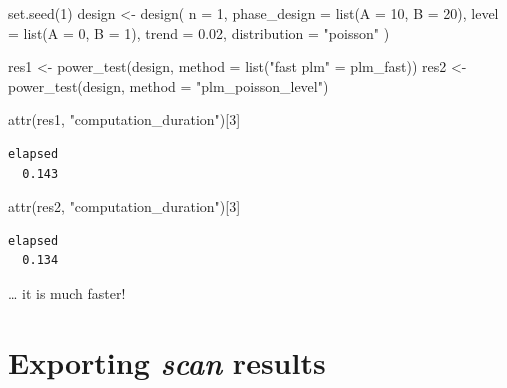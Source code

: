\documentclass[
  letterpaper,
  DIV=11,
  numbers=noendperiod]{scrreprt}
\newenvironment{Shaded}{\begin{snugshade}}{\end{snugshade}}
\newcommand{\AttributeTok}[1]{\textcolor[rgb]{0.40,0.45,0.13}{#1}}
\newcommand{\DecValTok}[1]{\textcolor[rgb]{0.68,0.00,0.00}{#1}}
\newcommand{\FloatTok}[1]{\textcolor[rgb]{0.68,0.00,0.00}{#1}}
\newcommand{\FunctionTok}[1]{\textcolor[rgb]{0.28,0.35,0.67}{#1}}
\newcommand{\NormalTok}[1]{\textcolor[rgb]{0.00,0.23,0.31}{#1}}
\newcommand{\OtherTok}[1]{\textcolor[rgb]{0.00,0.23,0.31}{#1}}
\newcommand{\StringTok}[1]{\textcolor[rgb]{0.13,0.47,0.30}{#1}}
\begin{document}
\begin{Shaded}
\begin{Highlighting}[]
\FunctionTok{set.seed}\NormalTok{(}\DecValTok{1}\NormalTok{)}
\NormalTok{design }\OtherTok{\textless{}{-}} \FunctionTok{design}\NormalTok{(}
  \AttributeTok{n =} \DecValTok{1}\NormalTok{,}
  \AttributeTok{phase\_design =} \FunctionTok{list}\NormalTok{(}\AttributeTok{A =} \DecValTok{10}\NormalTok{, }\AttributeTok{B =} \DecValTok{20}\NormalTok{),}
  \AttributeTok{level =} \FunctionTok{list}\NormalTok{(}\AttributeTok{A =} \DecValTok{0}\NormalTok{, }\AttributeTok{B =} \DecValTok{1}\NormalTok{),}
  \AttributeTok{trend =} \FloatTok{0.02}\NormalTok{,}
  \AttributeTok{distribution =} \StringTok{"poisson"}
\NormalTok{)}

\NormalTok{res1 }\OtherTok{\textless{}{-}} \FunctionTok{power\_test}\NormalTok{(design, }\AttributeTok{method =} \FunctionTok{list}\NormalTok{(}\StringTok{"fast plm"} \OtherTok{=}\NormalTok{ plm\_fast))}
\NormalTok{res2 }\OtherTok{\textless{}{-}} \FunctionTok{power\_test}\NormalTok{(design, }\AttributeTok{method =} \StringTok{"plm\_poisson\_level"}\NormalTok{)}

\FunctionTok{attr}\NormalTok{(res1, }\StringTok{"computation\_duration"}\NormalTok{)[}\DecValTok{3}\NormalTok{]}
\end{Highlighting}
\end{Shaded}

\begin{verbatim}
elapsed 
  0.143 
\end{verbatim}

\begin{Shaded}
\begin{Highlighting}[]
\FunctionTok{attr}\NormalTok{(res2, }\StringTok{"computation\_duration"}\NormalTok{)[}\DecValTok{3}\NormalTok{]}
\end{Highlighting}
\end{Shaded}

\begin{verbatim}
elapsed 
  0.134 
\end{verbatim}

\ldots{} it is much faster!


\hypertarget{exporting-scan-results}{%
\chapter{\texorpdfstring{Exporting \emph{scan}
results}{Exporting scan results}}\label{exporting-scan-results}}
\end{document}

